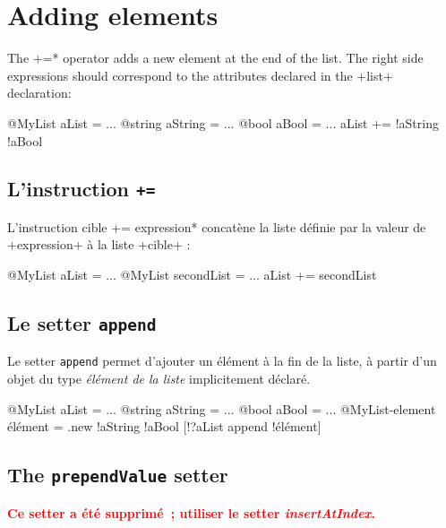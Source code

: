 \section{Adding elements}


The  \ggst*+=* operator adds a new element at the end of the list. The right side expressions should correspond to the attributes declared in the \ggst+list+ declaration:\\

\begin{galgas3}
@MyList aList = ...
@string aString = ...
@bool aBool = ...
aList += !aString !aBool
\end{galgas3}


\subsection{L'instruction \texttt{+=}}

L'instruction \ggst*cible += expression* concatène la liste définie par la valeur de \ggst+expression+ à la liste \ggst+cible+ :

\begin{galgas3}
@MyList aList = ...
@MyList secondList = ...
aList += secondList
\end{galgas3}







\subsection{Le setter \texttt{append}}

Le setter \texttt{append} permet d'ajouter un élément à la fin de la liste, à partir d'un objet du type \emph{élément de la liste} implicitement déclaré.


\begin{galgas3}
@MyList aList = ...
@string aString = ...
@bool aBool = ...
@MyList-element élément = .new {!aString !aBool}
[!?aList append !élément]
\end{galgas3}


\subsection{The \texttt{prependValue} setter}

{\bf \textcolor{red}{Ce setter a été supprimé~; utiliser le setter \emph{insertAtIndex}.}}

